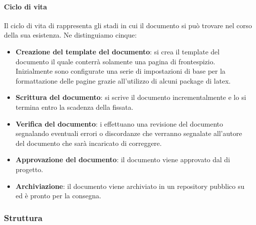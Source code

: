 \documentclass[../norme-di-progetto.tex]{subfiles}
\begin{document}
\paragraph{Ciclo di vita}
\label{par:ciclo di vita}
Il ciclo di vita di rappresenta gli stadi in cui il documento si può trovare nel corso della sua esistenza. Ne distinguiamo cinque:
\begin{itemize}
	\item \textbf{Creazione del template del documento}: si crea il template del documento il quale conterrà solamente una pagina di frontespizio. Inizialmente sono configurate una serie di impostazioni di base per la formattazione delle pagine grazie all'utilizzo di alcuni package di latex.
	\item \textbf{Scrittura del documento}: si scrive il documento incrementalmente e lo si termina entro la scadenza della  fissata.
	\item \textbf{Verifica del documento}: i  effettuano una revisione del documento segnalando eventuali errori o discordanze che verranno segnalate all'autore del documento che sarà incaricato di correggere.
	\item \textbf{Approvazione del documento}: il documento viene approvato dal  di progetto.
	\item \textbf{Archiviazione}: il documento viene archiviato in un repository pubblico su  ed è pronto per la consegna.
\end{itemize}
\subsubsection{Struttura}
\label{subs:struttura}
\end{document}
